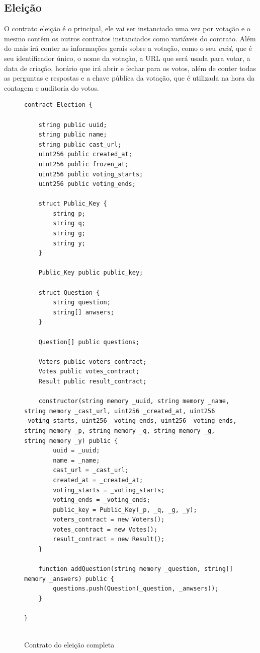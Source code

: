 \documentclass{ufsctex/ufsctex}
\begin{document}
\subsection{Eleição}

O contrato eleição é o principal, ele vai ser instanciado uma vez por votação e
o mesmo contêm os outros contratos instanciados como variáveis do contrato.
Além do mais irá conter as informações gerais sobre a votação, como o seu
\textit{uuid}, que é seu identificador único, o nome da votação, a URL que será
usada para votar, a data de criação, horário que irá abrir e fechar para os
votos, além de conter todas as perguntas e respostas e a chave pública da
votação, que é utilizada na hora da contagem e auditoria do votos.

\begin{figure}[H]
\centering
\begin{lstlisting}[language=Solidity]
contract Election {
    
    string public uuid;
    string public name;
    string public cast_url;
    uint256 public created_at;
    uint256 public frozen_at;
    uint256 public voting_starts;
    uint256 public voting_ends;
    
    struct Public_Key {
        string p;
        string q;
        string g;
        string y;
    }
    
    Public_Key public public_key;
    
    struct Question {
        string question;
        string[] anwsers;
    }
    
    Question[] public questions;
    
    Voters public voters_contract;
    Votes public votes_contract;
    Result public result_contract;
    
    constructor(string memory _uuid, string memory _name, string memory _cast_url, uint256 _created_at, uint256 _voting_starts, uint256 _voting_ends, uint256 _voting_ends, string memory _p, string memory _q, string memory _g, string memory _y) public {
        uuid = _uuid;
        name = _name;
        cast_url = _cast_url;
        created_at = _created_at;
        voting_starts = _voting_starts;
        voting_ends = _voting_ends;
        public_key = Public_Key(_p, _q, _g, _y);
        voters_contract = new Voters();
        votes_contract = new Votes();
        result_contract = new Result();
    }
    
    function addQuestion(string memory _question, string[] memory _answers) public {
        questions.push(Question(_question, _anwsers));
    }
    
}


\end{lstlisting}
	\caption{Contrato do eleição completa}
\end{figure}
\end{document}
